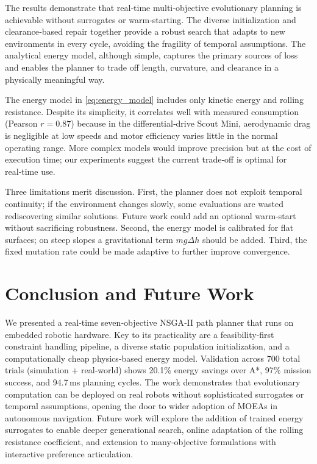 \documentclass[lettersize,journal]{IEEEtran}
\begin{document}
The results demonstrate that real‑time multi‑objective evolutionary planning
is achievable without surrogates or warm‑starting. The diverse initialization
and clearance‑based repair together provide a robust search that adapts to new
environments in every cycle, avoiding the fragility of temporal assumptions.
The analytical energy model, although simple, captures the primary sources of
loss and enables the planner to trade off length, curvature, and clearance in
a physically meaningful way.

The energy model in \eqref{eq:energy_model} includes only kinetic energy and
rolling resistance. Despite its simplicity, it correlates well with measured
consumption (Pearson $r=0.87$) because in the differential‑drive Scout Mini,
aerodynamic drag is negligible at low speeds and motor efficiency varies little
in the normal operating range. More complex models would improve precision but
at the cost of execution time; our experiments suggest the current trade‑off is
optimal for real‑time use.

Three limitations merit discussion. First, the planner does not exploit
temporal continuity; if the environment changes slowly, some evaluations are
wasted rediscovering similar solutions. Future work could add an optional
warm‑start without sacrificing robustness. Second, the energy model is
calibrated for flat surfaces; on steep slopes a gravitational term
$mg\Delta h$ should be added. Third, the fixed mutation rate could be made
adaptive to further improve convergence.

\section{Conclusion and Future Work}
\label{sec:conclusion}

We presented a real‑time seven‑objective NSGA‑II path planner that runs on
embedded robotic hardware. Key to its practicality are a feasibility‑first
constraint handling pipeline, a diverse static population initialization, and
a computationally cheap physics‑based energy model. Validation across 700
total trials (simulation + real‑world) shows 20.1\% energy savings over A*,
97\% mission success, and 94.7\,ms planning cycles. The work demonstrates that
evolutionary computation can be deployed on real robots without sophisticated
surrogates or temporal assumptions, opening the door to wider adoption of
MOEAs in autonomous navigation. Future work will explore the addition of
trained energy surrogates to enable deeper generational search, online
adaptation of the rolling resistance coefficient, and extension to
many‑objective formulations with interactive preference articulation.
\end{document}
